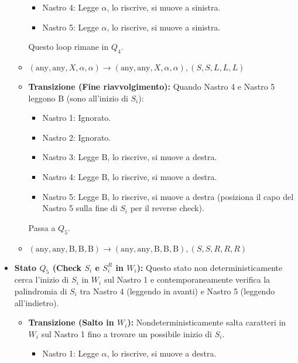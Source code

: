 \documentclass[a4paper]{article}
\newcommand{\B}{\text{B}} %
\newcommand{\alphaSym}{\alpha} %
\begin{document}
\begin{itemize}
\begin{itemize}
\begin{itemize}
                    \item Nastro 4: Legge $\alphaSym$, lo riscrive, si muove a sinistra.
                    \item Nastro 5: Legge $\alphaSym$, lo riscrive, si muove a sinistra.
                \end{itemize}
                Questo loop rimane in $Q_4$.
                \item $(\text{any}, \text{any}, X, \alphaSym, \alphaSym) \to (\text{any}, \text{any}, X, \alphaSym, \alphaSym), (S,S,L,L,L)$
            \item \textbf{Transizione (Fine riavvolgimento):}
                Quando Nastro 4 e Nastro 5 leggono $\B$ (sono all'inizio di $S_i$):
                \begin{itemize}
                    \item Nastro 1: Ignorato.
                    \item Nastro 2: Ignorato.
                    \item Nastro 3: Legge $\B$, lo riscrive, si muove a destra.
                    \item Nastro 4: Legge $\B$, lo riscrive, si muove a destra.
                    \item Nastro 5: Legge $\B$, lo riscrive, si muove a destra (posiziona il capo del Nastro 5 sulla fine di $S_i$ per il reverse check).
                \end{itemize}
                Passa a $Q_5$.
                \item $(\text{any}, \text{any}, \B, \B, \B) \to (\text{any}, \text{any}, \B, \B, \B), (S,S,R,R,R)$
        \end{itemize}
    \item \textbf{Stato $Q_5$ (Check $S_i$ e $S_i^R$ in $W_i$):}
        Questo stato non deterministicamente cerca l'inizio di $S_i$ in $W_i$ sul Nastro 1 e contemporaneamente verifica la palindromia di $S_i$ tra Nastro 4 (leggendo in avanti) e Nastro 5 (leggendo all'indietro).
        \begin{itemize}
            \item \textbf{Transizione (Salto in $W_i$):}
                Nondeterministicamente salta caratteri in $W_i$ sul Nastro 1 fino a trovare un possibile inizio di $S_i$.
                \begin{itemize}
                    \item Nastro 1: Legge $\alpha$, lo riscrive, si muove a destra.
                \end{itemize}

\end{itemize}
\end{itemize}
\end{document}
